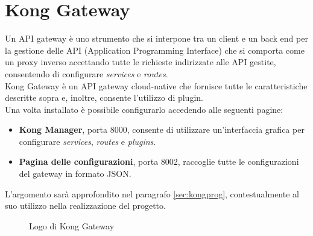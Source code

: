 \section{Kong Gateway}\label{sec:kongintro}
Un API gateway è uno strumento che si interpone tra un client e un back end per la gestione delle API (Application Programming Interface) che si comporta come un proxy inverso accettando tutte le richieste indirizzate alle API gestite, consentendo di configurare \emph{services} e \emph{routes}.\\
Kong Gateway è un API gateway cloud-native che fornisce tutte le caratteristiche descritte sopra e, inoltre, consente l'utilizzo di plugin. \cite{Kong}\\
Una volta installato è possibile configurarlo accedendo alle seguenti pagine:
\begin{itemize}
	\item \textbf{Kong Manager}, porta 8000, consente di utilizzare un'interfaccia grafica per configurare \emph{services}, \emph{routes} e \emph{plugins}.
	\item \textbf{Pagina delle configurazioni}, porta 8002, raccoglie tutte le configurazioni del gateway in formato JSON.
\end{itemize}

L'argomento sarà approfondito nel paragrafo \ref{sec:kongprog}, contestualmente al suo utilizzo nella realizzazione del progetto.

\begin{figure}[ht]
	\centering
	\caption{Logo di Kong Gateway}
	\label{fig:one}
\end{figure}

